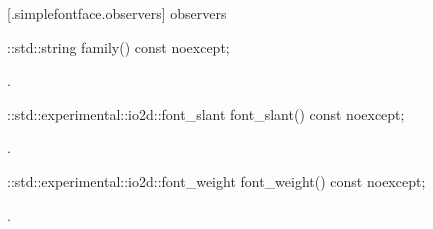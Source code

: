  [\iotwod.simplefontface.observers] { observers}

\begin{itemdecl}
::std::string family() const noexcept;
\end{itemdecl}
\begin{itemdescr}
	\pnum
	\returns
	.
\end{itemdescr}

\begin{itemdecl}
::std::experimental::io2d::font_slant font_slant() const noexcept;
\end{itemdecl}
\begin{itemdescr}
	\pnum
	\returns
	.
\end{itemdescr}

\begin{itemdecl}
::std::experimental::io2d::font_weight font_weight() const noexcept;
\end{itemdecl}
\begin{itemdescr}
	\pnum
	\returns
	.
\end{itemdescr}
